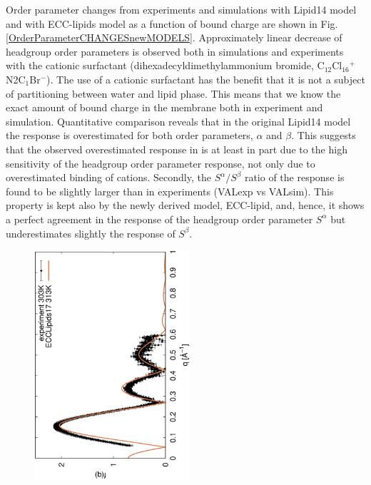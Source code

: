 \documentclass[aip,jcp,twocolumn]{revtex4}
\begin{document}
Order parameter changes from experiments \cite{seelig87} and simulations with Lipid14 model and with ECC-lipids model 
as a function of bound charge are shown in Fig. \ref{OrderParameterCHANGESnewMODELS}. 
Approximately linear decrease of headgroup order parameters is observed both 
in simulations and experiments with the cationic surfactant (dihexadecyldimethylammonium bromide, C$_{12}$Cl$_{16}$$^+$N2C$_1$Br$^-$). 
The use of a cationic surfactant has the benefit that it is not a subject of partitioning between water and lipid phase. 
This means that we know the exact amount of bound charge in the membrane both in experiment and simulation. 
Quantitative comparison reveals that in the original Lipid14 model the response is overestimated for both order parameters, $\alpha$ and $\beta$. 
This suggests that the observed overestimated response in \cite{catte16} 
is at least in part due to the high sensitivity of the headgroup order parameter response, 
not only due to overestimated binding of cations. 
Secondly, the $S^\alpha/S^\beta$ ratio of the response is found to be slightly larger than in 
experiments (VALexp vs VALsim).
This property is kept also by the newly derived model, ECC-lipid, and, hence, 
it shows a perfect agreement in the response of the headgroup order parameter $S^\alpha$ 
but underestimates slightly the response of $S^\beta$. 
\begin{figure}[]
  \centering
  \includegraphics[height=8.5cm,angle=-90]{../Fig/form-f_exp-l14-eccl17.eps}

\end{figure}$$
\end{document}
